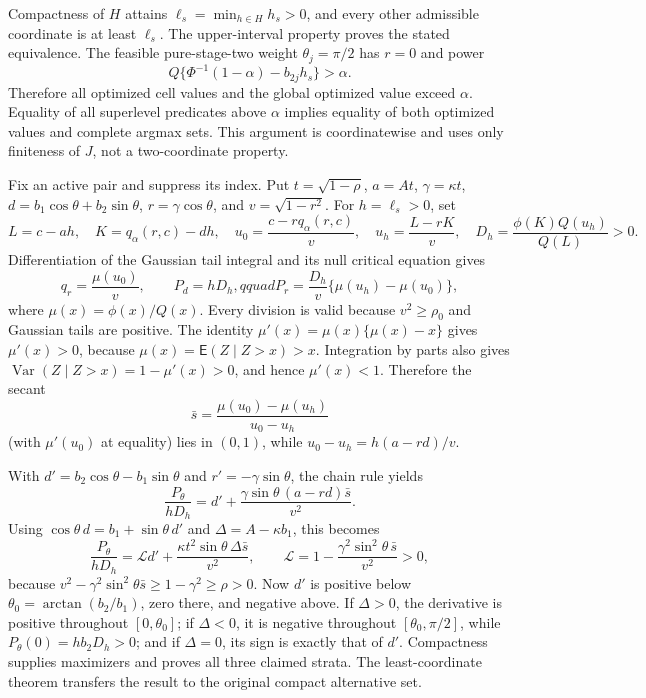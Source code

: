 Compactness of \(H\) attains \(\ell_s=\min_{h\in H}h_s>0\), and every other admissible coordinate is at least \(\ell_s\).  The upper-interval property proves the stated equivalence.  The feasible pure-stage-two weight \(\theta_j=\pi/2\) has \(r=0\) and power
\[
Q\{\Phi^{-1}(1-\alpha)-b_{2j}h_s\}>\alpha.
\]
Therefore all optimized cell values and the global optimized value exceed \(\alpha\).  Equality of all superlevel predicates above \(\alpha\) implies equality of both optimized values and complete argmax sets.  This argument is coordinatewise and uses only finiteness of \(J\), not a two-coordinate property.

Fix an active pair and suppress its index.  Put \(t=\sqrt{1-\rho}\), \(a=At\), \(\gamma=\kappa t\), \(d=b_1\cos\theta+b_2\sin\theta\), \(r=\gamma\cos\theta\), and \(v=\sqrt{1-r^2}\).  For \(h=\ell_s>0\), set
\[
L=c-ah,\quad K=q_\alpha(r,c)-dh,\quad
u_0=\frac{c-rq_\alpha(r,c)}v,\quad
u_h=\frac{L-rK}v,
\quad D_h=\frac{\phi(K)Q(u_h)}{Q(L)}>0.
\]
Differentiation of the Gaussian tail integral and its null critical equation gives
\[
q_r=\frac{\mu(u_0)}v,\qquad P_d=hD_h,qquad
P_r=\frac{D_h}{v}\{\mu(u_h)-\mu(u_0)\},
\]
where \(\mu(x)=\phi(x)/Q(x)\).  Every division is valid because \(v^2\ge\rho_0\) and Gaussian tails are positive.  The identity \(\mu'(x)=\mu(x)\{\mu(x)-x\}\) gives \(\mu'(x)>0\), because \(\mu(x)=\mathsf E(Z\mid Z>x)>x\).  Integration by parts also gives \(\operatorname{Var}(Z\mid Z>x)=1-\mu'(x)>0\), and hence \(\mu'(x)<1\).  Therefore the secant
\[
\bar s=\frac{\mu(u_0)-\mu(u_h)}{u_0-u_h}
\]
(with \(\mu'(u_0)\) at equality) lies in \((0,1)\), while \(u_0-u_h=h(a-rd)/v\).

With \(d'=b_2\cos\theta-b_1\sin\theta\) and \(r'=-\gamma\sin\theta\), the chain rule yields
\[
\frac{P_\theta}{hD_h}
=d'+\frac{\gamma\sin\theta\,(a-rd)\bar s}{v^2}.
\]
Using \(\cos\theta\,d=b_1+\sin\theta\,d'\) and \(\Delta=A-\kappa b_1\), this becomes
\[
\frac{P_\theta}{hD_h}
=\mathcal Ld'+\frac{\kappa t^2\sin\theta\,\Delta\bar s}{v^2},
\qquad
\mathcal L=1-\frac{\gamma^2\sin^2\theta\,\bar s}{v^2}>0,
\]
because \(v^2-\gamma^2\sin^2\theta\bar s\ge1-\gamma^2\ge\rho>0\).  Now \(d'\) is positive below \(\theta_0=\arctan(b_2/b_1)\), zero there, and negative above.  If \(\Delta>0\), the derivative is positive throughout \([0,\theta_0]\); if \(\Delta<0\), it is negative throughout \([\theta_0,\pi/2]\), while \(P_\theta(0)=hb_2D_h>0\); and if \(\Delta=0\), its sign is exactly that of \(d'\).  Compactness supplies maximizers and proves all three claimed strata.  The least-coordinate theorem transfers the result to the original compact alternative set.

